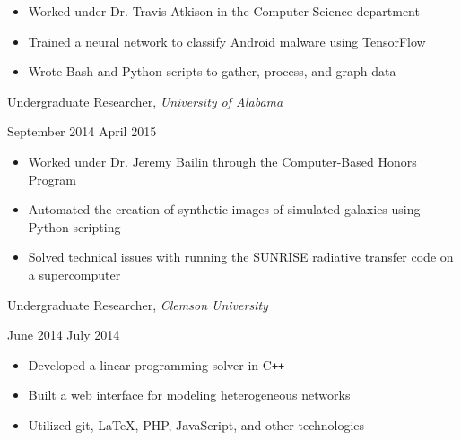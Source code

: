 \documentclass[11pt]{article}
\begin{document}
\begin{itemize}
  \item Worked under Dr. Travis Atkison in the Computer Science department
  \item Trained a neural network to classify Android malware using TensorFlow
  \item Wrote Bash and Python scripts to gather, process, and graph data
\end{itemize}

\vspace{0.4em}
\begin{minipage}[t]{0.65\textwidth}
\flushleft
Undergraduate Researcher, \textit{University of Alabama}\\
\end{minipage}
\begin{minipage}[t]{0.30\textwidth}
\flushright
September 2014 \space \textemdash \space April 2015\\
\end{minipage}

\begin{itemize}
  \item Worked under Dr. Jeremy Bailin through the Computer-Based Honors Program
  \item Automated the creation of synthetic images of simulated galaxies using Python scripting
  \item Solved technical issues with running the SUNRISE radiative transfer code on a supercomputer
\end{itemize}

\begin{minipage}[t]{0.65\textwidth}
\flushleft
Undergraduate Researcher, \textit{Clemson University}\\
\end{minipage}
\begin{minipage}[t]{0.30\textwidth}
\flushright
June 2014 \space \textemdash \space July 2014\\
\end{minipage}

\begin{itemize}
  \item Developed a linear programming solver in C\texttt{++}
  \item Built a web interface for modeling heterogeneous networks
  \item Utilized git, \LaTeX, PHP, JavaScript, and other technologies
\end{itemize}
\end{document}
